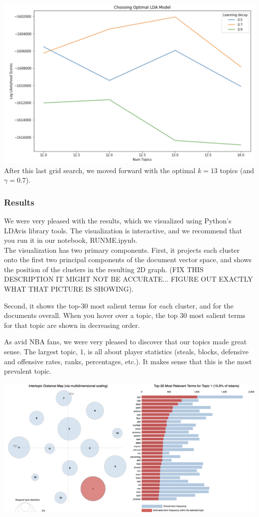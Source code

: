 \documentclass[11pt]{article}
\begin{document}
\includegraphics[width=400pt]{gridsearch2.png} \\

After this last grid search, we moved forward with the optimal $k=13$ topics (and $\gamma = 0.7$). \\


\subsubsection{Results}
We were very pleased with the results, which we visualized using Python's LDAvis library tools. The visualization is interactive, and we recommend that you run it in our notebook, RUNME.ipynb.  \\

The visualization has two primary components. First, it projects each cluster onto the first two principal components of the document vector space, and shows the position of the clusters in the resulting 2D graph.   (FIX THIS DESCRIPTION IT MIGHT NOT BE ACCURATE... FIGURE OUT EXACTLY WHAT THAT PICTURE IS SHOWING).

Second, it shows the top-30 most salient terms for each cluster, and for the documents overall. When you hover over a topic, the top 30 most salient terms for that topic are shown in decreasing order.

As avid NBA fans, we were very pleased to discover that our topics made great sense. The largest topic, 1, is all about player statistics (steals, blocks, defensive and offensive rates, ranks, percentages, etc.). It makes sense that this is the most prevalent topic. 

\includegraphics[width=400pt]{1.png} \\
\end{document}
